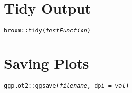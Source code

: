 \documentclass{tufte-handout}
\begin{document}
\vspace{5mm}
\section{Tidy Output}
\noindent \texttt{broom::}{\color{red}\texttt{tidy}}\texttt{(\textit{testFunction})}\\

\vspace{5mm}
\section{Saving Plots}
\noindent \texttt{ggplot2::}{\color{red}\texttt{ggsave}}\texttt{(\textit{filename}, dpi = \textit{val})}\\

\vspace{5mm}
\end{document}

